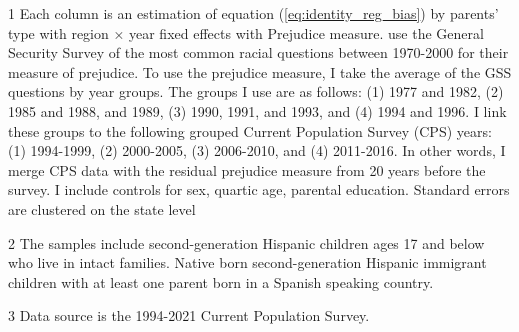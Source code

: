 \begin{table}[H]
{\begin{threeparttable}
\begin{tablenotes}
\item[1] \footnotesize{Each column is an estimation of equation (\ref{eq:identity_reg_bias}) by 
                      parents' type with region × year fixed effects with \citet{charlesPrejudiceWagesEmpirical2008} Prejudice measure. 
                      \citet{charlesPrejudiceWagesEmpirical2008} use the General Security Survey of the most common racial questions between 1970-2000 for their measure of prejudice.
                      To use the prejudice measure, I take the average of the GSS questions by year groups. The groups I use are as follows:
                      (1) 1977 and 1982, (2) 1985 and 1988, and 1989, (3) 1990, 1991, and 1993, and (4) 1994 and 1996. I link these groups to the following
                      grouped Current Population Survey (CPS) years: (1) 1994-1999, (2) 2000-2005, (3) 2006-2010, and (4) 2011-2016.
                      In other words, I merge CPS data with the residual prejudice  measure from 20 years before the survey.
                      I include controls for sex, quartic age, parental education.
                      Standard errors are clustered on the state level}
\item[2] \footnotesize{The samples include second-generation Hispanic children ages 17 and below who live in intact families. 
                      Native born second-generation Hispanic 
                      immigrant children with at least one parent born in a Spanish speaking 
                      country.}
\item[3] \footnotesize{Data source is the 1994-2021 Current Population Survey.}
\end{tablenotes}
\end{threeparttable}}
\end{table}
